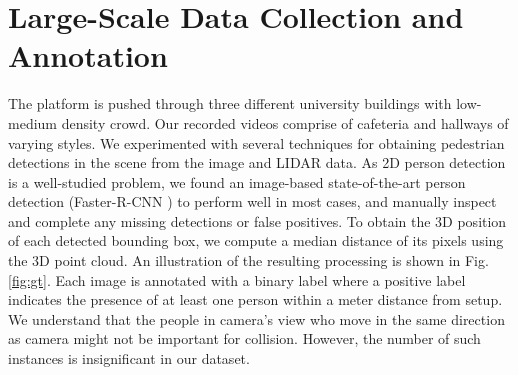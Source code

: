 



\section{Large-Scale Data Collection and Annotation}
The platform is pushed through three different university buildings with low-medium density crowd. Our recorded videos comprise of cafeteria and hallways of varying styles. 
We experimented with several techniques for obtaining pedestrian detections in the scene from the image and LIDAR data. As 2D person detection is a well-studied problem, we found an image-based state-of-the-art person detection (Faster-R-CNN \cite{fasterRCNN}) to perform well in most cases, and manually inspect and complete any missing detections or false positives. To obtain the 3D position of each detected bounding box, we compute a median distance of its pixels using the 3D point cloud. An illustration of the resulting processing is shown in Fig. \ref{fig:gt}. Each image is annotated with a binary label where a positive label indicates the presence of at least one person within a meter distance from setup. We understand that the people in camera's view who move in the same direction as camera might not be important for collision. However, the number of such instances is insignificant in our dataset. \\


